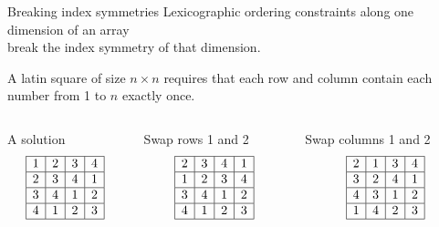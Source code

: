 \documentclass{cons-beamer}
\begin{document}
\begin{frame}{Breaking index symmetries}
  Lexicographic ordering constraints along \alert{one} dimension of an array \\
  break the index symmetry of that dimension. \vfill
  
  \begin{example}
    \small
    A latin square of size $n \times n$ requires that each row and column contain each number from 1 to $n$ exactly once. 
    \vfill

    \begin{columns}
      \begin{column}{0.3\textwidth}
        \centering A solution 
        \[
        \begin{array}{|c|c|c|c|}
          \hline
          1 & 2 & 3 & 4 \\
          \hline
          2 & 3 & 4 & 1 \\
          \hline
          3 & 4 & 1 & 2 \\
          \hline
          4 & 1 & 2 & 3 \\
          \hline
        \end{array}
        \]        
      \end{column}

      \begin{column}{0.3\textwidth}
        \centering Swap rows 1 and 2
        \[
        \begin{array}{|c|c|c|c|}
          \hline
          2 & 3 & 4 & 1 \\
          \hline
          1 & 2 & 3 & 4 \\
          \hline
          3 & 4 & 1 & 2 \\
          \hline
          4 & 1 & 2 & 3 \\
          \hline
        \end{array}
        \]        
      \end{column}

      \begin{column}{0.3\textwidth}
        \centering Swap columns 1 and 2
        \[
        \begin{array}{|c|c|c|c|}
          \hline
          2 & 1 & 3 & 4 \\
          \hline
          3 & 2 & 4 & 1 \\
          \hline
          4 & 3 & 1 & 2 \\
          \hline
          1 & 4 & 2 & 3 \\
          \hline
        \end{array}
        \]        
      \end{column}    
    \end{columns}
    \vfill


\end{example}
\end{frame}
\end{document}

